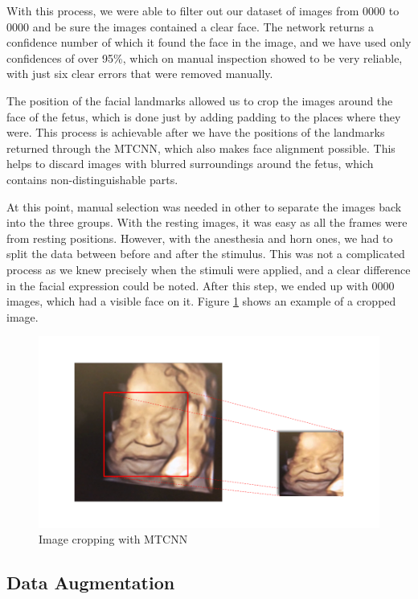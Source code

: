 With this process, we were able to filter out our dataset of images from 0000 to 0000 and be sure the images contained a clear face. The network returns a confidence number of which it found the face in the image, and we have used only confidences of over 95\%, which on manual inspection showed to be very reliable, with just six clear errors that were removed manually.

The position of the facial landmarks allowed us to crop the images around the face of the fetus, which is done just by adding padding to the places where they were. This process is achievable after we have the positions of the landmarks returned through the MTCNN, which also makes face alignment possible. This helps to discard images with blurred surroundings around the fetus, which contains non-distinguishable parts. 

At this point, manual selection was needed in other to separate the images back into the three groups. With the resting images, it was easy as all the frames were from resting positions. However, with the anesthesia and horn ones, we had to split the data between before and after the stimulus. This was not a complicated process as we knew precisely when the stimuli were applied, and a clear difference in the facial expression could be noted. After this step, we ended up with 0000 images, which had a visible face on it. Figure \ref{fig:cropping} shows an example of a cropped image.

\begin{figure}[h!tp]
    \centering
    \includegraphics[width=.9\textwidth]{imgs/chap3_cropping.png}
    \caption{Image cropping with MTCNN}
    \label{fig:cropping}
\end{figure}

\subsection{Data Augmentation}

